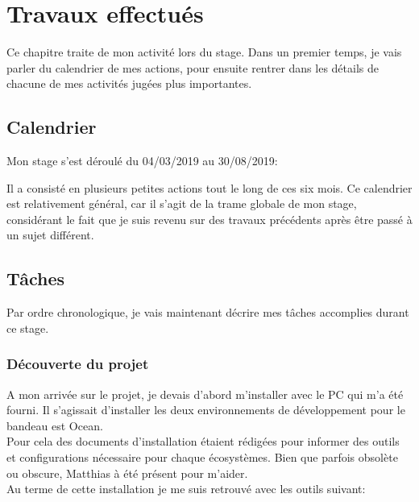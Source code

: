 \documentclass{rapport}
\begin{document}
\newpage

\section{Travaux effectués}

Ce chapitre traite de mon activité lors du stage. Dans un premier temps, je vais parler du calendrier de mes actions, pour ensuite rentrer dans les détails de chacune de mes activités jugées plus importantes.

\subsection{Calendrier}

Mon stage s'est déroulé du 04/03/2019 au 30/08/2019:\\


Il a consisté en plusieurs petites actions tout le long de ces six mois. Ce calendrier est relativement général, car il s'agit de la trame globale de mon stage, considérant le fait que je suis revenu sur des travaux précédents après être passé à un sujet différent.

\subsection{Tâches}

Par ordre chronologique, je vais maintenant décrire mes tâches accomplies durant ce stage. 

\subsubsection{Découverte du projet}

A mon arrivée sur le projet, je devais d'abord m'installer avec le PC qui m'a été fourni. Il s'agissait d'installer les deux environnements de développement pour le bandeau est Ocean.\\
Pour cela des documents d'installation étaient rédigées pour informer des outils et configurations nécessaire pour chaque écosystèmes. Bien que parfois obsolète ou obscure, Matthias à été présent pour m'aider.\\

Au terme de cette installation je me suis retrouvé avec les outils suivant:\\
\end{document}
